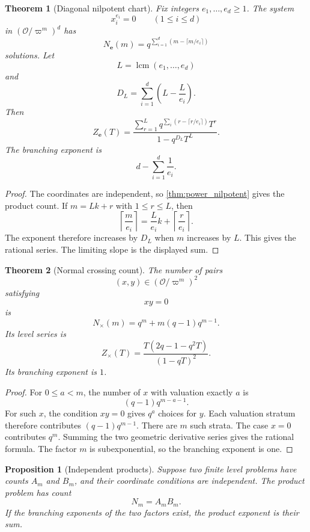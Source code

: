 \documentclass{aomart}
\newtheorem{theorem}{Theorem}[section]
\newtheorem{proposition}[proposition]{Proposition}
\theoremstyle{definition}
\theoremstyle{remark}
\newcommand{\OO}{\mathcal O}
\begin{document}
\begin{theorem}[Diagonal nilpotent chart]\label{thm:diagonal_nilpotent}
Fix integers \(e_1,\ldots,e_d\geq1\). The system
\[
x_i^{e_i}=0
\qquad(1\leq i\leq d)
\]
in \((\OO/\varpi^m)^d\) has
\[
\boxed{
N_{\bm e}(m)
=
q^{\sum_{i=1}^{d}(m-\lceil m/e_i\rceil)}
}
\]
solutions. Let
\[
L=\operatorname{lcm}(e_1,\ldots,e_d)
\]
and
\[
D_L
=
\sum_{i=1}^{d}\left(L-\frac{L}{e_i}\right).
\]
Then
\[
\boxed{
Z_{\bm e}(T)
=
\frac{
\sum_{r=1}^{L}
q^{\sum_i(r-\lceil r/e_i\rceil)}T^r
}{1-q^{D_L}T^L}.
}
\]
The branching exponent is
\[
\boxed{
d-\sum_{i=1}^{d}\frac1{e_i}.
}
\]
\end{theorem}

\begin{proof}
The coordinates are independent, so \cref{thm:power_nilpotent} gives the product count. If \(m=Lk+r\) with \(1\leq r\leq L\), then
\[
\left\lceil\frac{m}{e_i}\right\rceil
=
\frac{L}{e_i}k
+
\left\lceil\frac{r}{e_i}\right\rceil.
\]
The exponent therefore increases by \(D_L\) when \(m\) increases by \(L\). This gives the rational series. The limiting slope is the displayed sum.
\end{proof}

\begin{theorem}[Normal crossing count]\label{thm:normal_crossing_count}
The number of pairs
\[
(x,y)\in(\OO/\varpi^m)^2
\]
satisfying
\[
xy=0
\]
is
\[
\boxed{
N_{\times}(m)
=
q^m+m(q-1)q^{m-1}.
}
\]
Its level series is
\[
\boxed{
Z_{\times}(T)
=
\frac{T(2q-1-q^2T)}{(1-qT)^2}.
}
\]
Its branching exponent is \(1\).
\end{theorem}

\begin{proof}
For \(0\leq a<m\), the number of \(x\) with valuation exactly \(a\) is
\[
(q-1)q^{m-a-1}.
\]
For such \(x\), the condition \(xy=0\) gives \(q^a\) choices for \(y\). Each valuation stratum therefore contributes \((q-1)q^{m-1}\). There are \(m\) such strata. The case \(x=0\) contributes \(q^m\). Summing the two geometric derivative series gives the rational formula. The factor \(m\) is subexponential, so the branching exponent is one.
\end{proof}

\begin{proposition}[Independent products]\label{prop:independent_products}
Suppose two finite level problems have counts \(A_m\) and \(B_m\), and their coordinate conditions are independent. The product problem has count
\[
N_m=A_mB_m.
\]
If the branching exponents of the two factors exist, the product exponent is their sum.
\end{proposition}
\end{document}
